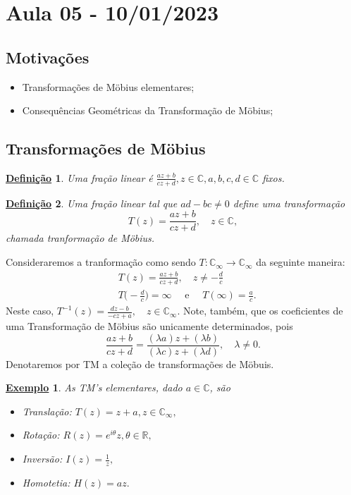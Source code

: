 \documentclass{article}
\newtheorem*{def*}{\underline{Defini\c c\~ao}}
\newtheorem{example}{\underline{Exemplo}}[section]
\begin{document}
\section{Aula 05 - 10/01/2023}
\subsection{Motiva\c c\~oes}
\begin{itemize}
  \item Transforma\c c\~oes de M\"{o}bius elementares;
  \item Consequ\^encias Geom\'etricas da Transforma\c c\~ao de M\"{o}bius;
\end{itemize}
\subsection{Transforma\c c\~oes de M\"{o}bius}
 \begin{def*}
   Uma fra\c c\~ao linear \'e $\frac{az + b}{cz + d}, z\in \mathbb{C}, a, b, c, d\in \mathbb{C}$ fixos.
 \end{def*}
\begin{def*}
  Uma fra\c c\~ao linear tal que $ad-bc\neq0$ define uma transforma\c c\~ao
  $$
  T(z) = \frac{az + b}{cz + d}, \quad z\in \mathbb{C},
  $$
chamada tranforma\c c\~ao de M\"{o}bius.
\end{def*}
  Consideraremos a tranforma\c c\~ao como sendo $T:\mathbb{C}_{\infty}\rightarrow \mathbb{C}_{\infty}$ da seguinte
maneira:
\begin{align*}
  &T(z) = \frac{az + b}{cz + d}, \quad z\neq -\frac{d}{c} \\
  &T\biggl(-\frac{d}{c}\biggr) = \infty \quad\text{ e }\quad T(\infty) = \frac{a}{c}.
\end{align*}
Neste caso, $T ^{-1}(z) = \displaystyle\frac{dz - b}{-cz + a}, \quad z\in \mathbb{C}_{\infty}.$ Note, tamb\'em, que os coeficientes
de uma Transforma\c c\~ao de M\"{o}bius s\~ao unicamente determinados, pois 
  $$
  \frac{az + b}{cz + d} = \frac{(\lambda a)z + (\lambda b)}{(\lambda c)z + (\lambda d)}, \quad \lambda\neq0.
  $$
  Denotaremos por TM a cole\c c\~ao de transforma\c c\~oes de M\"{o}buis.
 \begin{example}
  As TM's elementares, dado $a\in \mathbb{C}$, s\~ao
 \begin{itemize}
   \item[-] Transla\c c\~ao: $T(z) = z + a, z\in \mathbb{C}_{\infty},$
   \item[-] Rota\c c\~ao: $R(z) = e^{i \theta}z, \theta\in \mathbb{R},$
   \item[-] Invers\~ao: $I(z) = \frac{1}{z},$
   \item[-] Homotetia: $H(z) = az.$
 \end{itemize}
 \end{example}
\end{document}
